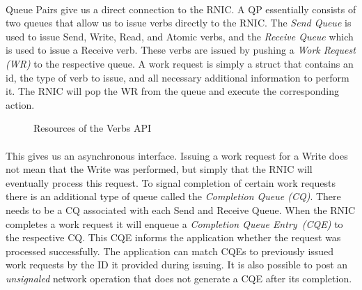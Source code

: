 \paragraph{} Queue Pairs give us a direct connection to the RNIC. A QP essentially consists of two queues that allow us to 
issue verbs directly to the RNIC. The \emph{Send Queue} is used to issue Send, Write, Read, and Atomic verbs, and the 
\emph{Receive Queue} which is used to issue a Receive verb. These verbs are issued by pushing a \emph{Work Request (WR)}
to the respective queue. A work request is simply a struct that contains an id, the type of verb to issue, and all necessary 
additional information to perform it. The RNIC will pop the WR from the queue and execute the corresponding action.

\begin{figure}[!ht]
\begin{center}
\end{center}
\caption{Resources of the Verbs API}
\label{fig:rdma-parts}
\end{figure}


\paragraph{} This gives us an asynchronous interface. Issuing a work request for a Write does not mean that the Write was
performed, but simply that the RNIC will eventually process this request. To signal completion of certain work requests there
is an additional type of queue called the \emph{Completion Queue (CQ)}. There needs to be a CQ associated with each Send and 
Receive Queue. When the RNIC completes a work request it will enqueue a \emph{Completion Queue Entry~(CQE)} to the respective
CQ. This CQE informs the application whether the request was processed successfully. The application can match CQEs to 
previously issued work requests by the ID it provided during issuing. It is also possible to post an \emph{unsignaled} network
operation that does not generate a CQE after its completion.


